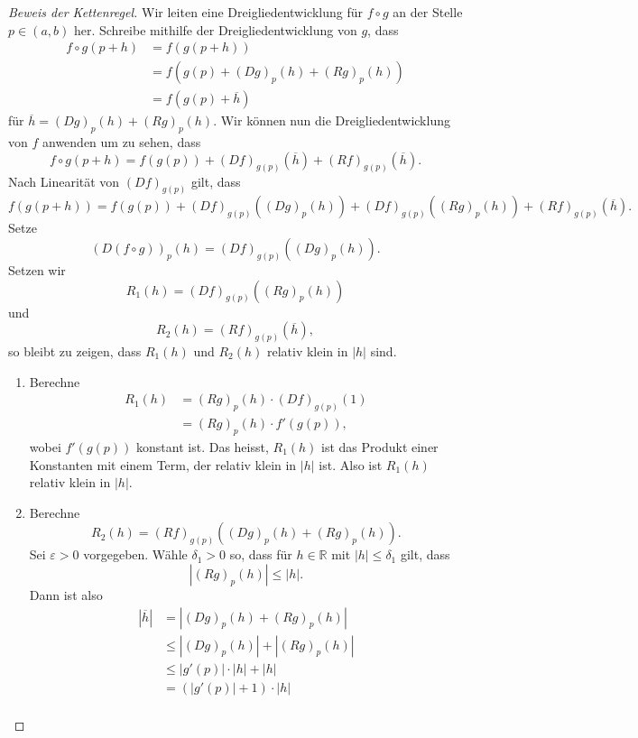 \documentclass[../main.tex]{subfiles}
\begin{document}
\begin{proof}[Beweis der Kettenregel]
  Wir leiten eine Dreigliedentwicklung
  für $f \circ g$ an der Stelle $p \in (a, b)$ her.
  Schreibe mithilfe der Dreigliedentwicklung
  von $g$, dass
  \begin{align*}
    f \circ g(p + h) 
    &= f(g(p+h))  \\
    &= f(g(p) + {(Dg)}_p(h) + {(Rg)}_p(h)) \\
    &= f(g(p) + \overline h)
  \end{align*}
  für $\overline h = {(Dg)}_p(h) + {(Rg)}_p(h)$.
  Wir können nun die Dreigliedentwicklung von $f$ 
  anwenden um zu sehen, dass
  \[
    f \circ g(p + h) = f(g(p)) + {(Df)}_{g(p)}(\overline h)
    + {(Rf)}_{g(p)}(\overline h).
  \]
  Nach Linearität von ${(Df)}_{g(p)}$ gilt, dass
  \[
    f(g(p+h)) = f(g(p)) + {(Df)}_{g(p)}(
    {(Dg)}_p(h))
    + {(Df)}_{g(p)}({(Rg)}_p(h))
    + {(Rf)}_{g(p)}(\overline h).
  \]
  Setze
  \[
    {(D(f \circ g))}_p(h) = {(Df)}_{g(p)}({(Dg)}_p(h)).
  \]
  Setzen wir
  \[
    R_1(h) = {(Df)}_{g(p)}({(Rg)}_p(h))
  \]
  und
  \[
    R_2(h) = {(Rf)}_{g(p)}(\overline h),
  \]
  so bleibt zu zeigen, dass $R_1(h)$ 
  und $R_2(h)$ relativ klein
  in $|h|$ sind.
  \begin{enumerate}[(1)]
    \item Berechne
      \begin{align*}
        R_1(h)
        & = {(Rg)}_p(h) \cdot {(Df)}_{g(p)}(1)\\
        & = {(Rg)}_p(h) \cdot f'(g(p)),
      \end{align*}
      wobei $f'(g(p))$ konstant ist.
      Das heisst, $R_1(h)$ ist das
      Produkt einer Konstanten mit
      einem Term, der relativ klein in $|h|$ ist.
      Also ist $R_1(h)$ relativ klein in $|h|$.
    \item Berechne
      \[
        R_2(h) 
        = {(Rf)}_{g(p)}({(Dg)}_p(h) + {(Rg)}_p(h)).
      \]
      Sei $\varepsilon > 0$ vorgegeben. Wähle
      $\delta_1 > 0$ so, dass
      für $h \in \mathbb{R}$ mit $|h| \leq \delta_1$ gilt,
      dass
      \[
        |{(Rg)}_p(h)| \leq |h|.
      \]
      Dann ist also
      \begin{align*}
         |\overline h| 
         & = |{(Dg)}_p(h) + {(Rg)}_p(h)|\\
         & \leq |{(Dg)}_p(h)| + |{(Rg)}_p(h)| \\
         &\leq |g'(p)| \cdot |h| + |h| \\
         &= (|g'(p)| + 1) \cdot |h| \\

\end{align*}
\end{enumerate}
\end{proof}
\end{document}
